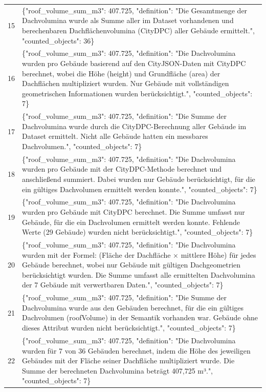 \documentclass[a4paper,11pt]{article}
\begin{document}
\begin{table}[ht]
\begin{tabular}{r p{12cm}}
15 & \{"roof\_volume\_sum\_m3": 407.725, "definition": "Die Gesamtmenge der Dachvolumina wurde als Summe aller im Dataset vorhandenen und berechenbaren Dachflächenvolumina (CityDPC) aller Gebäude ermittelt.", "counted\_objects": 36\} \\
16 & \{"roof\_volume\_sum\_m3": 407.725, "definition": "Die Dachvolumina wurden pro Gebäude basierend auf den CityJSON-Daten mit CityDPC berechnet, wobei die Höhe (height) und Grundfläche (area) der Dachflächen multipliziert wurden. Nur Gebäude mit vollständigen geometrischen Informationen wurden berücksichtigt.", "counted\_objects": 7\} \\
17 & \{"roof\_volume\_sum\_m3": 407.725, "definition": "Die Summe der Dachvolumina wurde durch die CityDPC-Berechnung aller Gebäude im Dataset ermittelt. Nicht alle Gebäude hatten ein messbares Dachvolumen.", "counted\_objects": 7\} \\
18 & \{"roof\_volume\_sum\_m3": 407.725, "definition": "Die Dachvolumina wurden pro Gebäude mit der CityDPC-Methode berechnet und anschließend summiert. Dabei wurden nur Gebäude berücksichtigt, für die ein gültiges Dachvolumen ermittelt werden konnte.", "counted\_objects": 7\} \\
19 & \{"roof\_volume\_sum\_m3": 407.725, "definition": "Die Dachvolumina wurden pro Gebäude mit CityDPC berechnet. Die Summe umfasst nur Gebäude, für die ein Dachvolumen ermittelt werden konnte. Fehlende Werte (29 Gebäude) wurden nicht berücksichtigt.", "counted\_objects": 7\} \\
20 & \{"roof\_volume\_sum\_m3": 407.725, "definition": "Die Dachvolumina wurden mit der Formel: (Fläche der Dachfläche × mittlere Höhe) für jedes Gebäude berechnet, wobei nur Gebäude mit gültigen Dachgeometrien berücksichtigt wurden. Die Summe umfasst alle ermittelten Dachvolumina der 7 Gebäude mit verwertbaren Daten.", "counted\_objects": 7\} \\
21 & \{"roof\_volume\_sum\_m3": 407.725, "definition": "Die Summe der Dachvolumina wurde aus den Gebäuden berechnet, für die ein gültiges Dachvolumen (roofVolume) in der Semantik vorhanden war. Gebäude ohne dieses Attribut wurden nicht berücksichtigt.", "counted\_objects": 7\} \\
22 & \{"roof\_volume\_sum\_m3": 407.725, "definition": "Die Dachvolumina wurden für 7 von 36 Gebäuden berechnet, indem die Höhe des jeweiligen Gebäudes mit der Fläche seiner Dachfläche multipliziert wurde. Die Summe der berechneten Dachvolumina beträgt 407,725 m³.", "counted\_objects": 7\} \\

\end{tabular}
\end{table}
\end{document}
